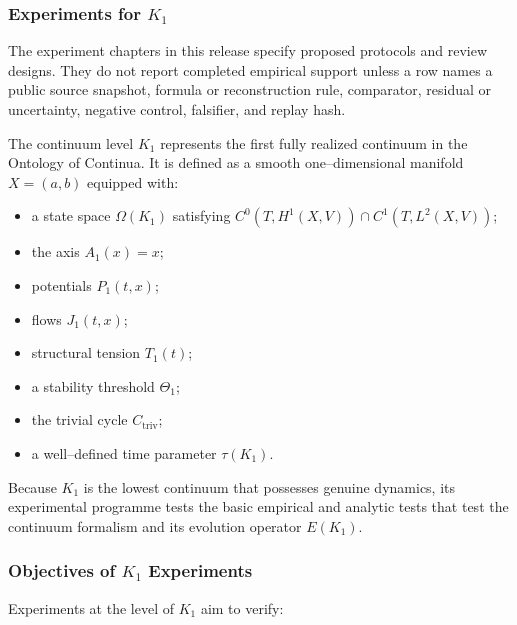 
\subsubsection{Experiments for \texorpdfstring{$K_1$}{K_1}}

The experiment chapters in this release specify proposed protocols and review designs. They do not report completed empirical support unless a row names a public source snapshot, formula or reconstruction rule, comparator, residual or uncertainty, negative control, falsifier, and replay hash.
\label{sec:experiments-k1}

The continuum level $K_1$ represents the first fully realized continuum in
the Ontology of Continua.
It is defined as a smooth one–dimensional manifold $X = (a,b)$ equipped with:
\begin{itemize}
    \item a state space $\Omega(K_1)$ satisfying
          $C^0(T,H^1(X,V))\cap C^1(T,L^2(X,V))$;
    \item the axis $A_1(x)=x$;
    \item potentials $P_1(t,x)$;
    \item flows $J_1(t,x)$;
    \item structural tension $T_1(t)$;
    \item a stability threshold $\Theta_1$;
    \item the trivial cycle $C_{\mathrm{triv}}$;
    \item a well–defined time parameter $\tau(K_1)$.
\end{itemize}

Because $K_1$ is the lowest continuum that possesses genuine dynamics,
its experimental programme tests the basic empirical and analytic
tests that test the continuum formalism and its evolution operator
$E(K_1)$.


\subsubsection{Objectives of \texorpdfstring{$K_1$}{K_1} Experiments}

Experiments at the level of $K_1$ aim to verify:

